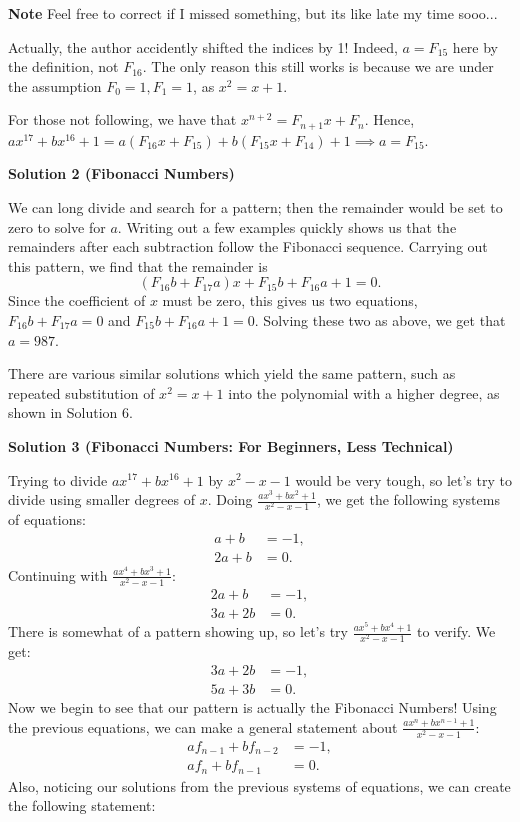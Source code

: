 \begin{enumerate}
 \textbf{Note} Feel free to correct if I missed something, but its like late my time sooo...

 Actually, the author accidently shifted the indices by 1! Indeed, $a = F_{15}$ here by the definition, not $F_{16}$. The only reason this still works is because we are under the assumption $F_0 = 1, F_1 = 1$, as $x^2 = x+1$. 

 For those not following, we have that $x^{n+2} = F_{n+1}x + F_n$. Hence, $ax^{17} + bx^{16} + 1 = a(F_{16}x + F_{15}) + b(F_{15}x + F_{14}) + 1 \implies a = F_{15}$.

 



\textbf{Solution 2 (Fibonacci Numbers)}

We can long divide and search for a pattern; then the remainder would be set to zero to solve for $a$. Writing out a few examples quickly shows us that the remainders after each subtraction follow the Fibonacci sequence. Carrying out this pattern, we find that the remainder is 
 \[(F_{16}b + F_{17}a)x + F_{15}b + F_{16}a + 1 = 0.\] Since the coefficient of $x$ must be zero, this gives us two equations, $F_{16}b + F_{17}a = 0$ and $F_{15}b + F_{16}a + 1 = 0$. Solving these two as above, we get that $a = \boxed{987}$.

 There are various similar solutions which yield the same pattern, such as repeated substitution of $x^2 = x + 1$ into the polynomial with a higher degree, as shown in Solution 6.

 



\textbf{Solution 3 (Fibonacci Numbers: For Beginners, Less Technical)}

Trying to divide $ax^{17} + bx^{16} + 1$ by $x^2-x-1$ would be very tough, so let's try to divide using smaller degrees of $x$. Doing $\frac{ax^3+bx^2+1}{x^2-x-1}$, we get the following systems of equations:
 \begin{align*} a+b &= -1, \\ 2a+b &= 0. \end{align*}
Continuing with $\frac{ax^4+bx^3+1}{x^2-x-1}$:
 \begin{align*} 2a+b &= -1, \\ 3a+2b &= 0. \end{align*}
There is somewhat of a pattern showing up, so let's try $\frac{ax^5+bx^4+1}{x^2-x-1}$ to verify. We get:
 \begin{align*} 3a+2b &= -1, \\ 5a+3b &= 0. \end{align*}
Now we begin to see that our pattern is actually the Fibonacci Numbers! Using the previous equations, we can make a general statement about $\frac{ax^n+bx^{n-1}+1}{x^2-x-1}$:
 \begin{align*} af_{n-1}+bf_{n-2} &= -1, \\ af_n+bf_{n-1} &= 0. \end{align*}
Also, noticing our solutions from the previous systems of equations, we can create the following statement:


\end{enumerate}
